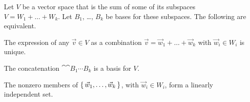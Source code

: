 \begin{lemma} \label{le:UniqDecIffBasisDec}
Let $V$ be a vector space that is the sum of some of its subspaces
$V=W_1+\dots+W_k$.
Let $B_1$, \ldots, $B_k$ be bases for these subspaces.
The following are equivalent.
\begin{tfae}
  \item The expression of any $\vec{v}\in V$ as a combination  
     $\vec{v}=\vec{w}_1+\dots+\vec{w}_k$ 
     with $\vec{w}_i\in W_i$ is unique.
  \item The concatenation $\cat{\cat{B_1}{\cdots}}{B_k}$ is a basis for $V$.
  \item The nonzero members of $\mbox{$\{\,\vec{w}_1,\dots,\vec{w}_k\,\}$}$,
    with $\vec{w}_i\in W_i$, form a linearly independent set.
\end{tfae}
\end{lemma}

